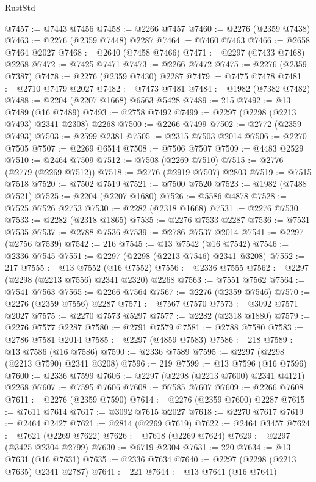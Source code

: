 \begin{lexlean}{RustStd}
\begin{coremodule}
@7457 := @7443 @7456
@7458 := @2266 @7457
@7460 := @2276 (@2359 @7438)
@7463 := @2276 (@2359 @7448) @2287
@7464 := @7460 @7463
@7466 := @2658 @7464 @2027
@7468 := @2640 (@7458 @7466)
@7471 := @2297 (@7433 @7468) @2268
@7472 := @7425 @7471
@7473 := @2266 @7472
@7475 := @2276 (@2359 @7387)
@7478 := @2276 (@2359 @7430) @2287
@7479 := @7475 @7478
@7481 := @2710 @7479 @2027
@7482 := @7473 @7481
@7484 := @1982 (@7382 @7482)
@7488 := @2204 (@2207 @1668) @6563 @5428
@7489 := 215
@7492 := @13 @7489 (@16 @7489)
@7493 := @2758 @7492
@7499 := @2297 (@2298 (@2213 @7493) @2341 @2308) @2268
@7500 := @2266 @7499
@7502 := @2772 (@2359 @7493)
@7503 := @2599 @2381
@7505 := @2315 @7503 @2014
@7506 := @2270 @7505
@7507 := @2269 @6514
@7508 := @7506 @7507
@7509 := @4483 @2529
@7510 := @2464 @7509
@7512 := @7508 (@2269 @7510)
@7515 := @2776 (@2779 (@2269 @7512))
@7518 := @2776 (@2919 @7507) @2803
@7519 := @7515 @7518
@7520 := @7502 @7519
@7521 := @7500 @7520
@7523 := @1982 (@7488 @7521)
@7525 := @2204 (@2207 @1680)
@7526 := @5586 @4878
@7528 := @7525 @7526 @2753
@7530 := @2282 (@2318 @1668)
@7531 := @2276 @7530
@7533 := @2282 (@2318 @1865)
@7535 := @2276 @7533 @2287
@7536 := @7531 @7535
@7537 := @2788 @7536
@7539 := @2786 @7537 @2014
@7541 := @2297 (@2756 @7539)
@7542 := 216
@7545 := @13 @7542 (@16 @7542)
@7546 := @2336 @7545
@7551 := @2297 (@2298 (@2213 @7546) @2341 @3208)
@7552 := 217
@7555 := @13 @7552 (@16 @7552)
@7556 := @2336 @7555
@7562 := @2297 (@2298 (@2213 @7556) @2341 @2320) @2268
@7563 := @7551 @7562
@7564 := @7541 @7563
@7565 := @2266 @7564
@7567 := @2276 (@2359 @7546)
@7570 := @2276 (@2359 @7556) @2287
@7571 := @7567 @7570
@7573 := @3092 @7571 @2027
@7575 := @2270 @7573 @5297
@7577 := @2282 (@2318 @1880)
@7579 := @2276 @7577 @2287
@7580 := @2791 @7579
@7581 := @2788 @7580
@7583 := @2786 @7581 @2014
@7585 := @2297 (@4859 @7583)
@7586 := 218
@7589 := @13 @7586 (@16 @7586)
@7590 := @2336 @7589
@7595 := @2297 (@2298 (@2213 @7590) @2341 @3208)
@7596 := 219
@7599 := @13 @7596 (@16 @7596)
@7600 := @2336 @7599
@7606 := @2297 (@2298 (@2213 @7600) @2341 @4121) @2268
@7607 := @7595 @7606
@7608 := @7585 @7607
@7609 := @2266 @7608
@7611 := @2276 (@2359 @7590)
@7614 := @2276 (@2359 @7600) @2287
@7615 := @7611 @7614
@7617 := @3092 @7615 @2027
@7618 := @2270 @7617
@7619 := @2464 @2427
@7621 := @2814 (@2269 @7619)
@7622 := @2464 @3457
@7624 := @7621 (@2269 @7622)
@7626 := @7618 (@2269 @7624)
@7629 := @2297 (@3425 @2304 @2799)
@7630 := @6719 @2304
@7631 := 220
@7634 := @13 @7631 (@16 @7631)
@7635 := @2336 @7634
@7640 := @2297 (@2298 (@2213 @7635) @2341 @2787)
@7641 := 221
@7644 := @13 @7641 (@16 @7641)

\end{coremodule}
\end{lexlean}
